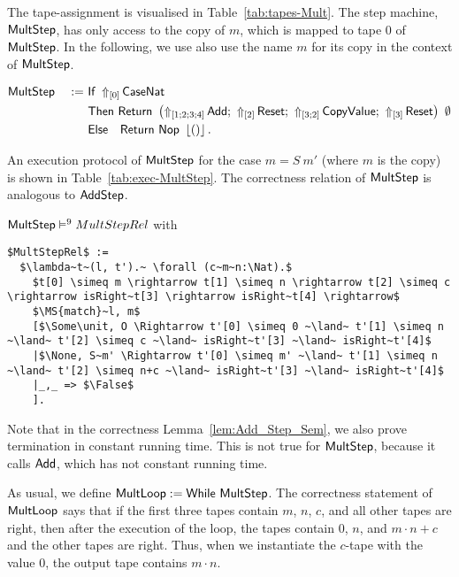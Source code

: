 The tape-assignment is visualised in Table~\ref{tab:tapes-Mult}.  The step machine, $\MS{MultStep}$, has only access to the copy of $m$, which is
mapped to tape $0$ of $\MS{MultStep}$.  In the following, we use also use the name $m$ for its copy in the context of $\MS{MultStep}$.
\begin{definition}
  \label{def:Mult_Step}
  \begin{alignat*}{2}
    &\MS{MultStep} &~:=~&
           \MS{If}~\LiftTapes{\MS{CaseNat}}{\Vector{0}} \\
    &&& \MS{Then}  ~\Return{\left( \LiftTapes{\MS{Add}}{\Vector{1;2;3;4}} \Seq
                                \LiftTapes{\MS{Reset}}{\Vector{2}} \Seq
                                \LiftTapes{\MS{CopyValue}}{\Vector{3;2}} \Seq
                                \LiftTapes{\MS{Reset}}{\Vector{3}} \right)}{\None} \\
    &&& \MS{Else}~~~\Return{\MS{Nop}}{\Some\unit}.
  \end{alignat*}
\end{definition}
An execution protocol of $\MS{MultStep}$ for the case $m=S~m'$ (where $m$ is the copy) is shown in Table~\ref{tab:exec-MultStep}.  The correctness
relation of $\MS{MultStep}$ is analogous to $\MS{AddStep}$.
\begin{lemma}
  \label{lem:Mult_Step_Sem}
  $\MS{MultStep} \RealiseIn{9} MultStepRel$ with
  \small
\begin{lstlisting}[style=semicoqstyle]
$MultStepRel$ :=
  $\lambda~t~(l, t').~ \forall (c~m~n:\Nat).$
    $t[0] \simeq m \rightarrow t[1] \simeq n \rightarrow t[2] \simeq c \rightarrow isRight~t[3] \rightarrow isRight~t[4] \rightarrow$
    $\MS{match}~l, m$
    [$\Some\unit, O \Rightarrow t'[0] \simeq 0 ~\land~ t'[1] \simeq n ~\land~ t'[2] \simeq c ~\land~ isRight~t'[3] ~\land~ isRight~t'[4]$
    |$\None, S~m' \Rightarrow t'[0] \simeq m' ~\land~ t'[1] \simeq n ~\land~ t'[2] \simeq n+c ~\land~ isRight~t'[3] ~\land~ isRight~t'[4]$
    |_,_ => $\False$
    ].
\end{lstlisting}
\end{lemma}
Note that in the correctness Lemma~\ref{lem:Add_Step_Sem}, we also prove termination in constant running time.  This is not true for $\MS{MultStep}$,
because it calls $\MS{Add}$, which has not constant running time.

As usual, we define $\MS{MultLoop} := \While~\MS{MultStep}$.  The correctness statement of $\MS{MultLoop}$ says that if the first three tapes contain
$m$, $n$, $c$, and all other tapes are right, then after the execution of the loop, the tapes contain $0$, $n$, and $m \cdot n + c$ and the other
tapes are right.  Thus, when we instantiate the $c$-tape with the value $0$, the output tape contains $m \cdot n$.

